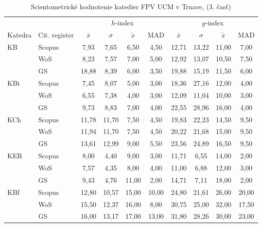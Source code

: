 \begin{table}
  \centering\small
  \caption[Hodnotenie FPV\,--\,$h$-index a $h$-index]{Scientometrické hodnotenie katedier FPV UCM v Trnave, (3. časť)}
\label{tab:3-staff.results}
\begin{tabularx}{\textwidth}{XXcccc@{\hspace{3ex}}cccc}
  \toprule\noalign{\vspace{.3ex}}
       &           & \multicolumn{4}{c}{$h$-index}     & \multicolumn{4}{c}{$g$-index}    \\
  Katedra & Cit. register & $\bar{x}$      & $\sigma$  & $\tilde{x}$ & MAD  & $\bar{x}$      & $\sigma$  & $\tilde{x}$  & MAD  \\[0.3ex]
  \midrule\noalign{\vspace{.5ex}}
 KB   & Scopus & 7,93    & 7,65  & 6,50  & 4,50  & 12,71   & 13,22 & 11,00 & 7,00  \\
      & WoS    & 8,23    & 7,57  & 7,00  & 5,00  & 12,92   & 13,07 & 10,50 & 7,50  \\
      & GS     & 18,88   & 8,39  & 6,00  & 3,50  & 19,88   & 15,19 & 11,50 & 6,00  \\[3ex]
 KBt  & Scopus & 7,45    & 8,07  & 5,00  & 3,00  & 18,36   & 27,16 & 12,00 & 4,00  \\
      & WoS    & 6,55    & 7,38  & 4,00  & 3,00  & 12,09   & 11,04 & 10,00 & 3,00  \\
      & GS     & 9,73    & 8,83  & 7,00  & 4,00  & 22,55   & 28,96 & 16,00 & 4,00  \\[3ex]
 KCh  & Scopus & 11,78   & 11,70 & 7,50  & 4,50  & 19,83   & 22,23 & 14,50 & 9,50  \\
      & WoS    & 11,94   & 11,70 & 7,50  & 4,50  & 20,22   & 21,68 & 15,00 & 9,50  \\
      & GS     & 13,61   & 12,99 & 9,00  & 5,50  & 23,56   & 24,89 & 16,50 & 9,50  \\[3ex]
 KER  & Scopus & 8,00    & 4,40  & 9,00  & 3,00  & 11,71   & 6,55  & 14,00 & 2,00  \\
      & WoS    & 7,57    & 4,35  & 8,00  & 4,00  & 11,00   & 6,88  & 12,00 & 3,00  \\
      & GS     & 9,43    & 4,76  & 11,00 & 2,00  & 14,71   & 7,11  & 18,00 & 2,00  \\[3ex]
 KBf  & Scopus & 12,80   & 10,57 & 15,00 & 10,00 & 24,80   & 21,61 & 26,00 & 20,00 \\
      & WoS    & 15,50   & 12,37 & 16,00 & 8,00  & 30,75   & 25,00 & 32,00 & 17,50 \\
      & GS     & 16,00   & 13,17 & 17,00 & 13,00 & 31,80   & 28,26 & 30,00 & 23,00 \\[3ex]

\end{tabularx}
\end{table}
